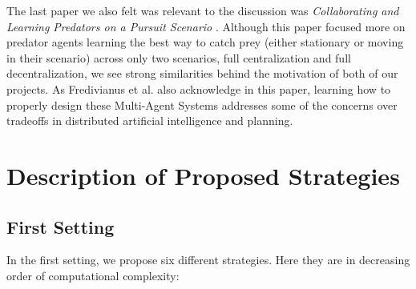 \documentclass[11pt]{article}
\begin{document}
The last paper we also felt was relevant to the discussion was \textit{ Collaborating and Learning Predators on a Pursuit Scenario } \cite{fredivianus2010collaborating}. Although this paper focused more on predator agents learning the best way to catch prey (either stationary or moving in their scenario) across only two scenarios, full centralization and full decentralization, we see strong similarities behind the motivation of both of our projects. As Fredivianus et al. also acknowledge in this paper, learning how to properly design these Multi-Agent Systems addresses some of the concerns over tradeoffs in distributed artificial intelligence and planning. 

 
\section{Description of Proposed Strategies}
\subsection{First Setting}
In the first setting, we propose six different strategies. Here they are in decreasing order of computational complexity:
\end{document}
